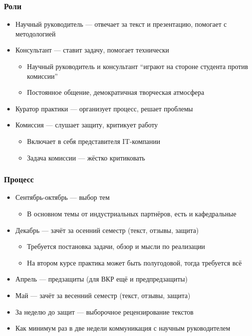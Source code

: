 \documentclass[xetex,mathserif,serif]{beamer}
\begin{document}
    \begin{frame}
        \frametitle{Роли}
        \begin{itemize}
            \item Научный руководитель --- отвечает за текст и презентацию, помогает с методологией
            \item Консультант --- ставит задачу, помогает технически
            \begin{itemize}
                \item Научный руководитель и консультант ``играют на стороне студента против комиссии''
                \item Постоянное общение, демократичная творческая атмосфера
            \end{itemize}
            \item Куратор практики --- организует процесс, решает проблемы
            \item Комиссия --- слушает защиту, критикует работу
            \begin{itemize}
                \item Включает в себя представителя IT-компании
                \item Задача комиссии --- жёстко критиковать
            \end{itemize}
        \end{itemize}
    \end{frame}

    \begin{frame}
        \frametitle{Процесс}
        \begin{itemize}
            \item Сентябрь-октябрь --- выбор тем
            \begin{itemize}
                \item В основном темы от индустриальных партнёров, есть и кафедральные
            \end{itemize}
            \item Декабрь --- зачёт за осенний семестр (текст, отзывы, защита)
            \begin{itemize}
                \item Требуется постановка задачи, обзор и мысли по реализации
                \item На втором курсе практика может быть полугодовой, тогда требуется всё
            \end{itemize}
            \item Апрель --- предзащиты (для ВКР ещё и предпредзащиты)
            \item Май --- зачёт за весенний семестр (текст, отзывы, защита)
            \item За неделю до защит --- выборочное рецензирование текстов
            \item Как минимум раз в две недели коммуникация с научным руководителем
        \end{itemize}
    \end{frame}
\end{document}
